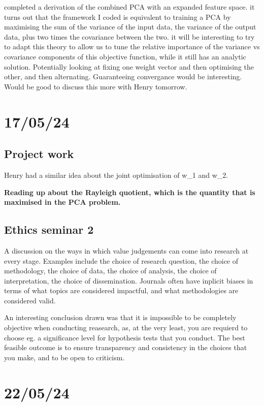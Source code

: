 \documentclass[11pt,a4paper]{article}
\begin{document}
completed a derivation of the combined PCA with an expanded feature space.
it turns out that the framework I coded is equivalent to training a PCA by maximising the sum of the variance of the input data, the variance of the output data, plus two times the covariance between the two.
it will be interesting to try to adapt this theory to allow us to tune the relative importance of the variance vs covariance components of this objective function, while it still has an analytic solution.
Potentially looking at fixing one weight vector and then optimising the other, and then alternating.
Guaranteeing convergance would be interesting.
Would be good to discuss this more with Henry tomorrow.

\section{17/05/24}

\subsection{Project work}

Henry had a similar idea about the joint optimisation of w_1 and w_2.

\textbf{Reading up about the Rayleigh quotient, which is the quantity that is maximised in the PCA problem.}

\subsection{Ethics seminar 2}

A discussion on the ways in which value judgements can come into research at every stage.
Examples include the choice of research question, the choice of methodology, the choice of data, the choice of analysis, the choice of interpretation, the choice of dissemination.
Journals often have inplicit biases in terms of what topics are considered impactful, and what methodologies are considered valid.

An interesting conclusion drawn was that it is impossible to be completely objective when conducting reasearch, as, at the very least, you are requierd to choose eg. a significance level for hypothesis tests that you conduct.
The best feasible outcome is to ensure transparency and consistency in the choices that you make, and to be open to criticism.

\section{22/05/24}
\end{document}
